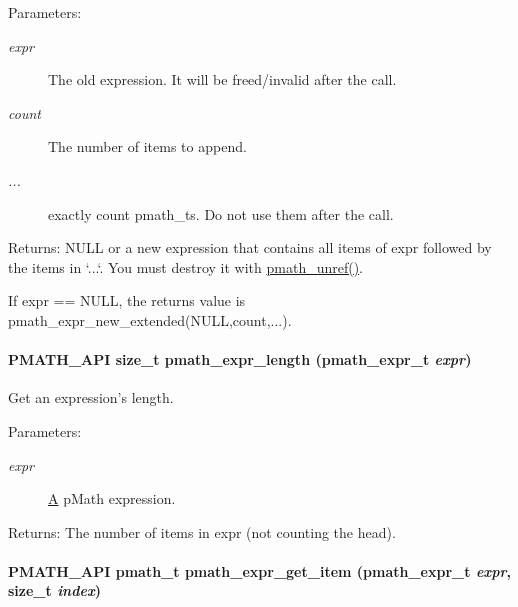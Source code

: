 \begin{Desc}
\item[Parameters:]
\begin{description}
\item[{\em expr}]The old expression. It will be freed/invalid after the call. \item[{\em count}]The number of items to append. \item[{\em ...}]exactly count pmath\_\-ts. Do not use them after the call. \end{description}
\end{Desc}
\begin{Desc}
\item[Returns:]NULL or a new expression that contains all items of expr followed by the items in `...`. You must destroy it with \hyperlink{classpmath__t_54e905402c38940687033b87eb8c6c9f}{pmath\_\-unref()}.\end{Desc}
If expr == NULL, the returns value is pmath\_\-expr\_\-new\_\-extended(NULL,count,...). \hypertarget{group__expressions_gf77c0a198380cd9b3e7e1a47f41f57c0}{
\paragraph[{pmath\_\-expr\_\-length}]{\setlength{\rightskip}{0pt plus 5cm}PMATH\_\-API size\_\-t pmath\_\-expr\_\-length ({\bf pmath\_\-expr\_\-t} {\em expr})}\hfill}
\label{group__expressions_gf77c0a198380cd9b3e7e1a47f41f57c0}


Get an expression's length. 

\begin{Desc}
\item[Parameters:]
\begin{description}
\item[{\em expr}]\hyperlink{class_a}{A} pMath expression. \end{description}
\end{Desc}
\begin{Desc}
\item[Returns:]The number of items in expr (not counting the head). \end{Desc}
\hypertarget{group__expressions_g70b7099d22d00d94f52df167b4e42364}{
\paragraph[{pmath\_\-expr\_\-get\_\-item}]{\setlength{\rightskip}{0pt plus 5cm}PMATH\_\-API {\bf pmath\_\-t} pmath\_\-expr\_\-get\_\-item ({\bf pmath\_\-expr\_\-t} {\em expr}, \/  size\_\-t {\em index})}\hfill}
\label{group__expressions_g70b7099d22d00d94f52df167b4e42364}


